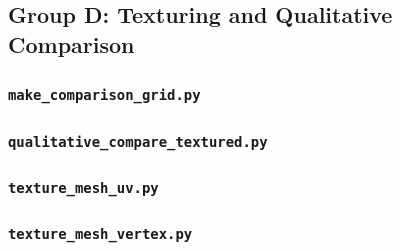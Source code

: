 \documentclass[12pt]{article}
\begin{document}
\subsection{Group D: Texturing and Qualitative Comparison}

\subsubsection{\texttt{make\_comparison\_grid.py}}


\subsubsection{\texttt{qualitative\_compare\_textured.py}}


\subsubsection{\texttt{texture\_mesh\_uv.py}}


\subsubsection{\texttt{texture\_mesh\_vertex.py}}

\end{document}
